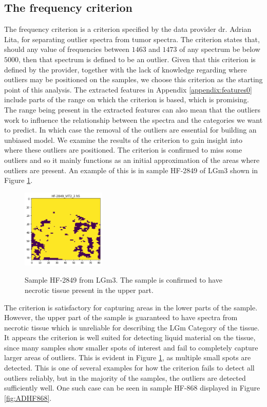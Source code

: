 \subsection{The frequency criterion}

The frequency criterion is a criterion specified by the data provider dr. Adrian Lita,  for separating outlier spectra from tumor spectra. The criterion states that, should any value of frequencies between $1463$ and $1473$ of any spectrum be below $5000$, then that spectrum is defined to be an outlier. Given that this criterion is defined by the provider, together with the lack of knowledge regarding where outliers may be positioned on the samples, we choose this criterion as the starting point of this analysis. The extracted features in Appendix \ref{appendix:features0} include parts of the range on which the criterion is based, which is promising. The range being present in the extracted features can also mean that the outliers work to influence the relationship between the spectra and the categories we want to predict. In which case the removal of the outliers are essential for building an unbiased model. We examine the results of the criterion to gain insight into where these outliers are positioned. The criterion is confirmed to miss some outliers and so it mainly functions as an initial approximation of the areas where outliers are present. An example of this is in sample HF-2849 of LGm3 shown in Figure \ref{fig:HF2849_1}.

\begin{figure}[H]

    \centering
{\includegraphics[width=4cm]{images/AdriansCriterion/LGm-3/HF-2849_VIT2_2.h5_5.png} }
\caption{Sample HF-2849 from LGm3. The sample is confirmed to have necrotic tissue present in the upper part.\label{fig:HF2849_1}}%

\end{figure}

The criterion is satisfactory for capturing areas in the lower parts of the sample. However, the upper part of the sample is guaranteed to have spectra from necrotic tissue which is unreliable for describing the LGm Category of the tissue. It appears the criterion is well suited for detecting liquid material on the tissue, since many samples show smaller spots of interest and fail to completely capture larger areas of outliers. This is evident in Figure \ref{fig:HF2849_1}, as multiple small spots are detected. This is one of several examples for how the criterion fails to detect all outliers reliably, but in the majority of the samples, the outliers are detected sufficiently well. One such case can be seen in sample HF-868 displayed in Figure \ref{fig:ADHF868}.

